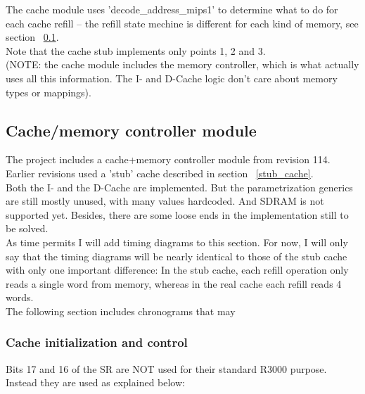 \documentclass[11pt]{article}
\begin{document}
    The cache module uses 'decode\_address\_mips1' to determine what to do for 
    each cache refill -- the refill state mechine is different for each kind of 
    memory, see section ~\ref{cache}.\\
    
    Note that the cache stub implements only points 1, 2 and 3.\\

    (NOTE: the cache module includes the memory controller, which is what 
    actually uses all this information. The I- and D-Cache logic don't care
    about memory types or mappings).\\



\subsection{Cache/memory controller module}
\label{cache}

    The project includes a cache+memory controller module from revision 114. 
    Earlier revisions used a 'stub' cache described in section ~\ref{stub_cache}.\\
        
    Both the I- and the D-Cache are implemented. But the parametrization 
    generics are still mostly unused, with many values hardcoded. And SDRAM is 
    not supported yet. Besides, there are some loose ends in the implementation 
    still to be solved.\\
    
    As time permits I will add timing diagrams to this section. For now, I will
    only say that the timing diagrams will be nearly identical to those of the
    stub cache with only one important difference: In the stub cache, each 
    refill operation only reads a single word from memory, whereas in the real 
    cache each refill reads 4 words.\\
    
    The following section includes chronograms that may 

\subsubsection{Cache initialization and control}
\label{cache_init_and_control}

    Bits 17 and 16 of the SR are NOT used for their standard R3000 purpose.
    Instead they are used as explained below:
    
\end{document}
